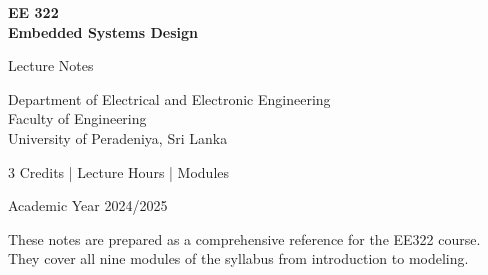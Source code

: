 \documentclass[12pt,oneside]{book}
\begin{document}
\begin{titlepage}
\centering
\vspace*{2cm}

{\Huge\bfseries\color{ee-blue} EE 322\\[0.3cm] Embedded Systems Design}

\vspace{1cm}

{\LARGE Lecture Notes}

\vspace{2cm}

{\Large Department of Electrical and Electronic Engineering\\
Faculty of Engineering\\
University of Peradeniya, Sri Lanka}

\vspace{2cm}

{\large 3 Credits \quad| Lecture Hours \quad| Modules}

\vspace{3cm}

{\normalsize Academic Year 2024/2025}

\vspace{\fill}

{\small\color{ee-gray}
These notes are prepared as a comprehensive reference for the EE322 course.\\
They cover all nine modules of the syllabus from introduction to modeling.}

\end{titlepage}

\frontmatter
\tableofcontents
\listoffigures
\listoftables

\mainmatter











\backmatter

\printbibliography[heading=bibintoc, title={References}]
\end{document}
